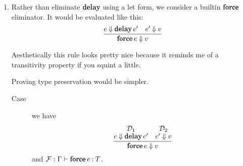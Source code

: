 \documentclass[11pt,letterpaper]{article}
\DeclareMathOperator{\LetOp}{\mathqd{let}}
\DeclareMathOperator{\InOp}{\mathqd{in}}
\newcommand{\Let}[2]{\LetOp #1 \InOp #2}
\DeclareMathOperator{\DelayOp}{\mathqd{delay}}
\newcommand{\delay}{\DelayOp}
\DeclareMathOperator{\ForceOp}{\mathqd{force}}
\newcommand{\force}{\ForceOp}
\begin{document}
\begin{enumerate}
    Since we don't evaluate $\delay e$, we simply consider delayed computations
    to be values. This agrees with the idea that values should evaluate to
    themselves, since $\delay e \evalbig \delay e$.

    \begin{prop}
      If $e \evalbig v$, then $v$ is a value.
    \end{prop}

    \begin{proof}
      By structural induction on $\mathcal{D} : e \evalbig v$.

      \begin{description}
        \item[Case]
          $\mathcal{D} : \delay e \evalbig \delay e$ is trivial.

        \item[Case] we have that $\mathcal{D}$ is
          \begin{equation*}
            \infer{\Let{\delay x = e_1}{e_2} \evalbig v}{
              \deduce[\mathcal{D}_1]{e_1 \evalbig \delay e^\prime}{}
              &
              \deduce[\mathcal{D}^\prime]{[e^\prime/x]e_2 \evalbig v}{}
            }
          \end{equation*}

          We appeal to the induction hypothesis on $\mathcal{D}^\prime$ and
          immediately conclude $v$ is a value.
      \end{description}
    \end{proof}

  \item
    Rather than eliminate $\delay$ using a let form, we consider a builtin
    $\force$ eliminator.
    It would be evaluated like this:
    \begin{equation*}
      \infer{\force e \evalbig v}{
        e \evalbig \delay e^\prime
        &
        e^\prime \evalbig v
      }
    \end{equation*}

    Aesthetically this rule looks pretty nice because it reminds me of a
    transitivity property if you squint a little.

    Proving type preservation would be simpler.
    \begin{description}
      \item[Case]
        we have
        \begin{equation*}
          \infer{\force e \evalbig v}{
            \deduce[\mathcal{D}_1]{e \evalbig \delay e^\prime}{}
            &
            \deduce[\mathcal{D}_2]{e^\prime \evalbig v}{}
          }
        \end{equation*}
        and
        $\mathcal{F} : \Gamma \proves \force e \hastype T$.


\end{description}
\end{enumerate}
\end{document}
